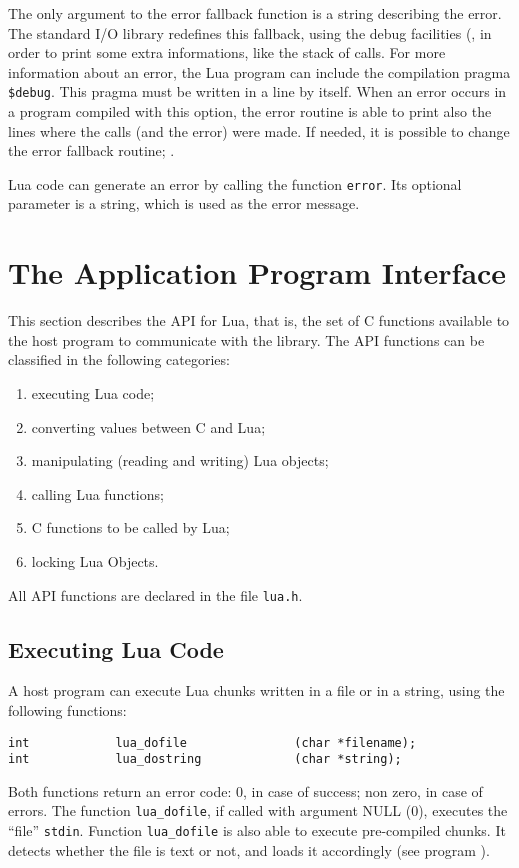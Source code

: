 The only argument to the error fallback function is a string describing
the error.
The standard I/O library redefines this fallback,
using the debug facilities (,
in order to print some extra informations,
like the stack of calls.
For more information about an error,
the Lua program can include the compilation pragma \verb'$debug'.
\label{pragma}
This pragma must be written in a line by itself.
When an error occurs in a program compiled with this option,
the error routine is able to print also the lines where the calls
(and the error) were made.
If needed, it is possible to change the error fallback routine;
.

Lua code can generate an error by calling the function \verb'error'.
Its optional parameter is a string,
which is used as the error message.


\section{The Application Program Interface}

This section describes the API for Lua, that is,
the set of C functions available to the host program to communicate
with the library.
The API functions can be classified in the following categories:
\begin{enumerate}
\item executing Lua code;
\item converting values between C and Lua;
\item manipulating (reading and writing) Lua objects;
\item calling Lua functions;
\item C functions to be called by Lua;
\item locking Lua Objects.
\end{enumerate}
All API functions are declared in the file \verb'lua.h'.

\subsection{Executing Lua Code}
A host program can execute Lua chunks written in a file or in a string,
using the following functions:
\begin{verbatim}
int            lua_dofile               (char *filename);
int            lua_dostring             (char *string);
\end{verbatim}
Both functions return an error code:
0, in case of success; non zero, in case of errors.
The function \verb'lua_dofile', if called with argument NULL (0),
executes the ``file'' {\tt stdin}.
Function \verb'lua_dofile' is also able to execute pre-compiled chunks.
It detects whether the file is text or not,
and loads it accordingly (see program ).

